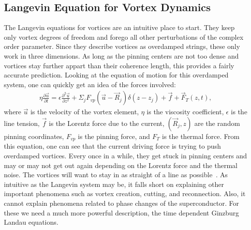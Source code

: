 \subsection{Langevin Equation for Vortex Dynamics}
The Langevin equations for vortices are an intuitive place to start. They keep only vortex degrees of freedom and forego all other perturbations of the complex order parameter. Since they describe vortices as overdamped strings, these only work in three dimensions. As long as the pinning centers are not too dense and vortices stay further appart than their coherence length, this provides a fairly accurate prediction. Looking at the equation of motion for this overdamped system, one can quickly get an idea of the forces involved:
\begin{eqnarray}
\eta \frac {\partial \overrightarrow u}{\partial t} = \epsilon \frac {\partial^2 \overrightarrow u} {\partial z^2 } + \Sigma_j F_{vp} (\overrightarrow u - \overrightarrow R_j) \delta(z - z_j) + \overrightarrow f + \overrightarrow F_T(z,t), 
\label{Langevin}
\end{eqnarray}
where $\overrightarrow u$ is the velocity of the vortex element, $\eta$ is the viscosity coefficient, $\epsilon$ is the line tension, $\overrightarrow f$ is the Lorentz force due to the current, $(\overrightarrow R_j,z)$ are the random pinning coordinates, $F_{vp}$ is the pinning force, and $F_T$ is the thermal force. From this equation, one can see that the current driving force is trying to push overdamped vortices. Every once in a while, they get stuck in pinning centers and may or may not get out again depending on the Lorentz force and the thermal noise. The vortices will want to stay in as straight of a line as possible~\cite{Kwok16}. As intuitive as the Langevin system may be, it falls short on explaining other important phenomena such as vortex creation, cutting, and reconnection. Also, it cannot explain phenomena related to phase changes of the superconductor. For these we need a much more powerful description, the time dependent Ginzburg Landau equations. 

